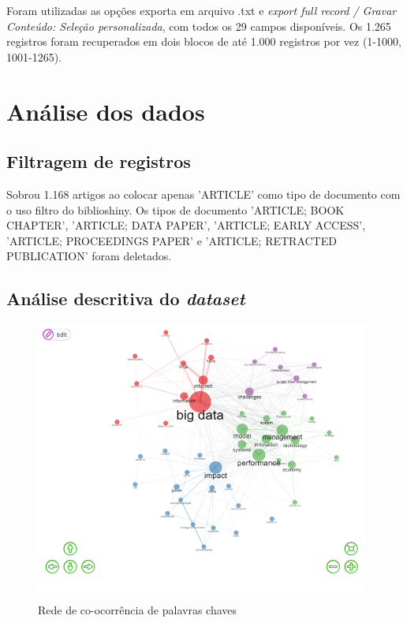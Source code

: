 Foram utilizadas as opções exporta em arquivo .txt e \textit{export full record / Gravar Conteúdo: Seleção personalizada}, com todos os 29 campos disponíveis. Os 1.265 registros foram recuperados em dois blocos de até 1.000 registros por vez (1-1000, 1001-1265).


\section{Análise dos dados}

\subsection{Filtragem de registros}

Sobrou 1.168 artigos ao colocar apenas 'ARTICLE' como tipo de documento com o uso filtro do biblioshiny. Os tipos de documento 'ARTICLE; BOOK CHAPTER', 'ARTICLE; DATA PAPER', 'ARTICLE; EARLY ACCESS', 'ARTICLE; PROCEEDINGS PAPER' e 'ARTICLE; RETRACTED PUBLICATION' foram deletados.


\subsection{Análise descritiva do \textit{dataset}} 


\begin{figure}[ht]
    \centering
    \includegraphics[width=11cm]{experiments/Tong00020/PesquisaBibliometrica/Conceptual Structure/MASSA@Tong00020-Co-occurrence Network}
    \caption{Rede de co-ocorrência de palavras chaves}
    \label{fig:rede}
\end{figure}

